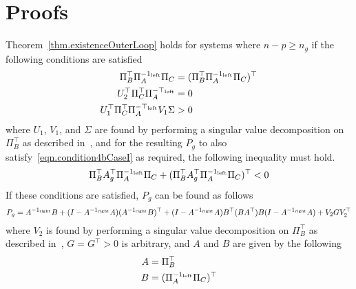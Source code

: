 \chapter{Proofs}\label{app.proofs}

\begin{lem-dan}
  Theorem~\ref{thm.existenceOuterLoop} holds for systems where $n-p\geq n_{g}$ if the following conditions are satisfied
  \begin{align}
    \label{eqn.PiAtallCond1}
    \Pi_{B}^{\top}\Pi_{A}^{-1_{\text{\rm{left}}}}\Pi_{C} &=
    (\Pi_{B}^{\top}\Pi_{A}^{-1_{\text{\rm{left}}}}\Pi_{C})^{\top} \\
    \label{eqn.PiAtallCond2}
    U_{2}^{\top}\Pi_{C}^{\top}\Pi_{A}^{-\top_{\text{\rm{left}}}} &= 0 \\
    \label{eqn.PiAtallCond3}
    U_{1}^{\top}\Pi_{C}^{\top}\Pi_{A}^{-\top_{\text{\rm{left}}}}V_{1}\Sigma &>0
  \end{align}
  where $U_{1}$, $V_{1}$, and $\Sigma$ are found by performing a singular value decomposition on $\Pi_{B}^{\top}$ as described in\ \cite{hua.symmetric.1990}, and for the resulting $P_{g}$ to also satisfy\ \eqref{eqn.condition4bCaseI} as required, the following inequality must hold.
  \begin{equation}
    \label{eqn.PiAtallCond4}
    \Pi_{B}^{\top}A_{g}^{\top}\Pi_{A}^{-1_{\text{\rm{left}}}}\Pi_{C} +
    (\Pi_{B}^{\top}A_{g}^{\top}\Pi_{A}^{-1_{\text{\rm{left}}}}\Pi_{C})^{\top} <0
  \end{equation}
  If these conditions are satisfied, $P_{g}$ can be found as follows
  \begin{equation*}
    P_{g}
    =
    A^{-1_{\text{\rm{right}}}}B+(I-A^{-1_{\text{\rm{right}}}}A)(A^{-1_{\text{\rm{right}}}}B)^{\top}+(I-A^{-1_{\text{\rm{right}}}}A)B^{\top}(BA^{\top})B(I-A^{-1_{\text{\rm{right}}}}A)+V_{2}GV_{2}^{\top}
  \end{equation*}
  where $V_{2}$ is found by performing a singular value decomposition on $\Pi_{B}^{\top}$ as described in\ \cite{hua.symmetric.1990}, $G=G^{\top}>0$ is arbitrary, and $A$ and $B$ are given by the following
  \begin{align*}
    A &= \Pi_{B}^{\top} \\
    B &= (\Pi_{A}^{-1_{\text{\rm{left}}}}\Pi_{C})^{\top}
  \end{align*}
\end{lem-dan}


